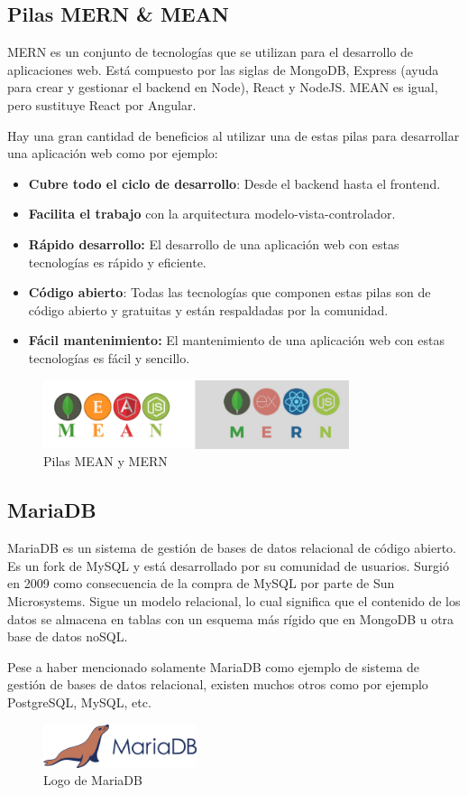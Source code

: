 \subsection{Pilas MERN \& MEAN}
MERN es un conjunto de tecnologías que se utilizan para el desarrollo de aplicaciones web. Está compuesto por las siglas de MongoDB, Express (ayuda para crear y gestionar el backend en Node), React y NodeJS. MEAN es igual, pero sustituye React por
Angular. 

Hay una gran cantidad de beneficios al utilizar una de estas pilas para desarrollar una aplicación web como por ejemplo:
\begin{itemize}
\item \textbf{Cubre todo el ciclo de desarrollo}: Desde el backend hasta el frontend.
\item \textbf{Facilita el trabajo} con la arquitectura modelo-vista-controlador.
\item \textbf{Rápido desarrollo:} El desarrollo de una aplicación web con estas tecnologías es rápido y eficiente.
\item \textbf{Código abierto}: Todas las tecnologías que componen estas pilas son de código abierto y gratuitas y están respaldadas por la comunidad.
\item \textbf{Fácil mantenimiento:} El mantenimiento de una aplicación web con estas tecnologías es fácil y sencillo.
\end{itemize}

\begin{figure}[H]
    \centering
    \includegraphics[width=0.8\textwidth]{imagenes/c2/MERN.png}
    \caption{Pilas MEAN y MERN}
\end{figure}

\subsection{MariaDB}
MariaDB es un sistema de gestión de bases de datos relacional de código abierto. Es un fork de MySQL y está desarrollado por su comunidad de usuarios. Surgió en 2009 como
consecuencia de la compra de MySQL por parte de Sun Microsystems.
Sigue un modelo relacional, lo cual significa que el contenido de los datos se almacena en tablas con un esquema más rígido que en MongoDB u otra base de datos noSQL.

Pese a haber mencionado solamente MariaDB como ejemplo de sistema de gestión de bases de datos relacional, existen muchos otros como por ejemplo PostgreSQL, MySQL, etc.


\begin{figure}[H]
    \centering
    \includegraphics[width=0.4\textwidth]{imagenes/c2/mariadb.png}
    \caption{Logo de MariaDB}
\end{figure}